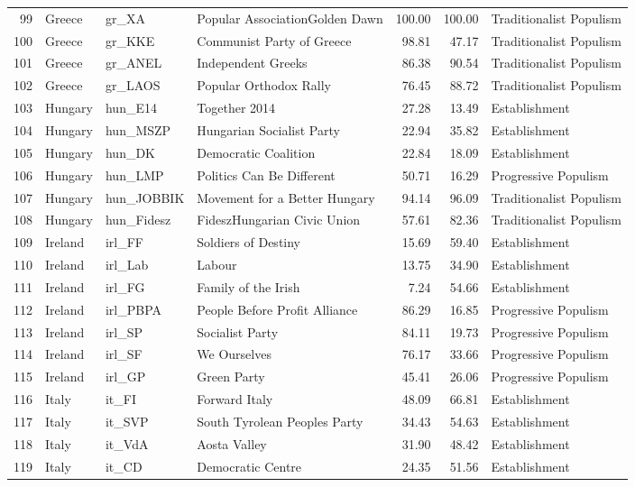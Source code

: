 \begin{landscape}
\begin{longtable}[c]{@{\extracolsep{\fill}}rlllrrl}
  99 & Greece & gr\_XA & Popular AssociationGolden Dawn & 100.00 & 100.00 & Traditionalist Populism \\ 
  100 & Greece & gr\_KKE & Communist Party of Greece & 98.81 & 47.17 & Traditionalist Populism \\ 
  101 & Greece & gr\_ANEL & Independent Greeks & 86.38 & 90.54 & Traditionalist Populism \\ 
  102 & Greece & gr\_LAOS & Popular Orthodox Rally & 76.45 & 88.72 & Traditionalist Populism \\ 
  103 & Hungary & hun\_E14 & Together 2014 & 27.28 & 13.49 & Establishment \\ 
  104 & Hungary & hun\_MSZP & Hungarian Socialist Party & 22.94 & 35.82 & Establishment \\ 
  105 & Hungary & hun\_DK & Democratic Coalition & 22.84 & 18.09 & Establishment \\ 
  106 & Hungary & hun\_LMP & Politics Can Be Different & 50.71 & 16.29 & Progressive Populism \\ 
  107 & Hungary & hun\_JOBBIK & Movement for a Better Hungary & 94.14 & 96.09 & Traditionalist Populism \\ 
  108 & Hungary & hun\_Fidesz & FideszHungarian Civic Union & 57.61 & 82.36 & Traditionalist Populism \\ 
  109 & Ireland & irl\_FF & Soldiers of Destiny & 15.69 & 59.40 & Establishment \\ 
  110 & Ireland & irl\_Lab & Labour & 13.75 & 34.90 & Establishment \\ 
  111 & Ireland & irl\_FG & Family of the Irish & 7.24 & 54.66 & Establishment \\ 
  112 & Ireland & irl\_PBPA & People Before Profit Alliance & 86.29 & 16.85 & Progressive Populism \\ 
  113 & Ireland & irl\_SP & Socialist Party & 84.11 & 19.73 & Progressive Populism \\ 
  114 & Ireland & irl\_SF & We Ourselves & 76.17 & 33.66 & Progressive Populism \\ 
  115 & Ireland & irl\_GP & Green Party & 45.41 & 26.06 & Progressive Populism \\ 
  116 & Italy & it\_FI & Forward Italy & 48.09 & 66.81 & Establishment \\ 
  117 & Italy & it\_SVP & South Tyrolean Peoples Party & 34.43 & 54.63 & Establishment \\ 
  118 & Italy & it\_VdA & Aosta Valley & 31.90 & 48.42 & Establishment \\ 
  119 & Italy & it\_CD & Democratic Centre & 24.35 & 51.56 & Establishment \\ 

\end{longtable}
\end{landscape}

